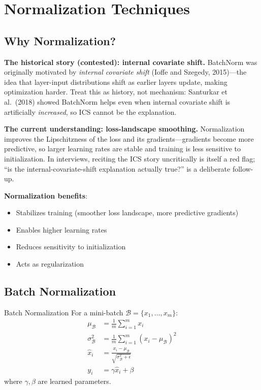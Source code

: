 \section{Normalization Techniques}
\label{sec:normalization}

\subsection{Why Normalization?}

\textbf{The historical story (contested): internal covariate shift.} BatchNorm was originally motivated by \textit{internal covariate shift} (Ioffe and Szegedy, 2015)---the idea that layer-input distributions shift as earlier layers update, making optimization harder. Treat this as history, not mechanism: Santurkar et al.\ (2018) showed BatchNorm helps even when internal covariate shift is artificially \textit{increased}, so ICS cannot be the explanation.

\textbf{The current understanding: loss-landscape smoothing.} Normalization improves the Lipschitzness of the loss and its gradients---gradients become more predictive, so larger learning rates are stable and training is less sensitive to initialization. In interviews, reciting the ICS story uncritically is itself a red flag; ``is the internal-covariate-shift explanation actually true?'' is a deliberate follow-up.

\textbf{Normalization benefits}:
\begin{itemize}
    \item Stabilizes training (smoother loss landscape, more predictive gradients)
    \item Enables higher learning rates
    \item Reduces sensitivity to initialization
    \item Acts as regularization
\end{itemize}

\subsection{Batch Normalization}

\begin{mathresult}{Batch Normalization}
For a mini-batch $\mathcal{B} = \{x_1, \ldots, x_m\}$:
\begin{align}
\mu_\mathcal{B} &= \frac{1}{m}\sum_{i=1}^m x_i \\
\sigma_\mathcal{B}^2 &= \frac{1}{m}\sum_{i=1}^m (x_i - \mu_\mathcal{B})^2 \\
\hat{x}_i &= \frac{x_i - \mu_\mathcal{B}}{\sqrt{\sigma_\mathcal{B}^2 + \epsilon}} \\
y_i &= \gamma \hat{x}_i + \beta
\end{align}
where $\gamma, \beta$ are learned parameters.
\end{mathresult}


